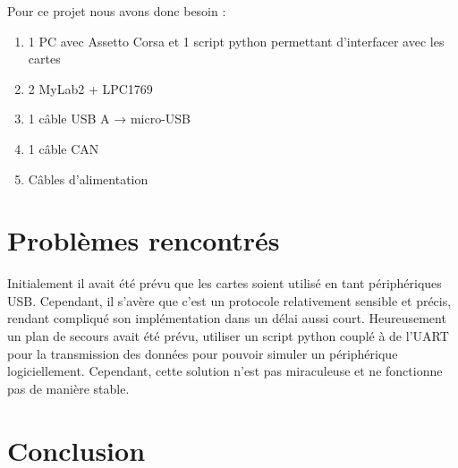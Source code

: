 \documentclass[french, 11pt]{article}
\begin{document}
        Pour ce projet nous avons donc besoin :

        \begin{enumerate}
            \item 1 PC avec Assetto Corsa et 1 script python permettant d'interfacer avec les cartes
            \item 2 MyLab2 + LPC1769
            \item 1 câble USB A → micro-USB
            \item 1 câble CAN
            \item Câbles d'alimentation
        \end{enumerate}


	\section{Problèmes rencontrés}

	Initialement il avait été prévu que les cartes soient utilisé en tant périphériques USB. Cependant, il s'avère que c'est un protocole relativement sensible et précis, rendant compliqué son implémentation dans un délai aussi court. Heureusement un plan de secours avait été prévu, utiliser un script python couplé à de l'UART pour la transmission des données pour pouvoir simuler un périphérique logiciellement. Cependant, cette solution n'est pas miraculeuse et ne fonctionne pas de manière stable.

    \section{Conclusion}
\end{document}
